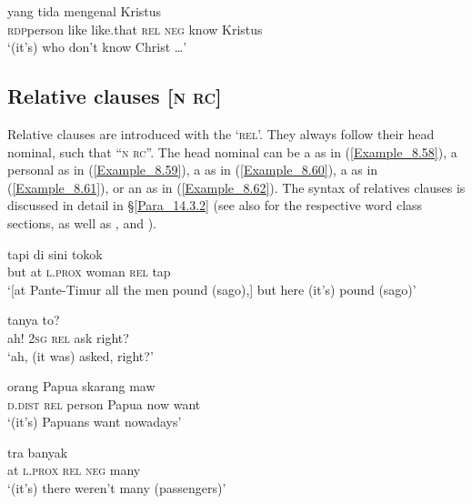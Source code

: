 \ea
\label{Example_8.57}
 {} {} {yang} {tida} {mengenal} {Kristus}\\ %
 \textsc{rdp}{\Tilde}person  like  like.that  \textsc{rel}  \textsc{neg}  know  Kristus\\
\glt
‘(it’s)  who don’t know Christ {\ldots}’ \textstyleExampleSource{[081006-023-CvEx.0034]}
\z


\subsection{Relative clauses [\textsc{n} \textsc{rc}]}
\label{Para_8.2.8}
Relative clauses are introduced with the   ‘\textsc{rel}’. They always follow their head nominal, such that ``\textsc{n} \textsc{rc}''. The head nominal can be a  as in (\ref{Example_8.58}), a personal  as in (\ref{Example_8.59}), a  as in (\ref{Example_8.60}), a  as in (\ref{Example_8.61}), or an  as in (\ref{Example_8.62}). The syntax of relatives clauses is discussed in detail in §\ref{Para_14.3.2} (see also  for the respective word class sections, as well as , and ).


\ea
\label{Example_8.58}
\gll {\ldots} {tapi} {di} {sini} {} {} {tokok}\\ %
  { }  but  at  \textsc{l.prox}  woman  \textsc{rel}  tap\\
\glt 
‘[at Pante-Timur all the men pound (sago),] but here (it’s)  pound (sago)’ \textstyleExampleSource{[081014-007-CvEx.0073]}
\z

\ea
\label{Example_8.59}
 {} {} {tanya} {to?}\\ %
 ah!  \textsc{2sg}  \textsc{rel}  ask  right?\\
\glt 
‘ah, (it was)  asked, right?’ \textstyleExampleSource{[080923-014-CvEx.0010]}
\z

\ea
\label{Example_8.60}
 {} {orang} {Papua} {skarang} {maw}\\ %
 \textsc{d.dist}  \textsc{rel}  person  Papua  now  want\\
\glt 
‘(it’s)  Papuans want nowadays’ \textstyleExampleSource{[081025-004-Cv.0077]}
\z

\ea
\label{Example_8.61}
 {} {} {tra} {banyak}\\ %
 at  \textsc{l.prox}  \textsc{rel}  \textsc{neg}  many\\
 ‘(it’s)  there weren’t many (passengers)’ \textstyleExampleSource{[081025-008-Cv.0140]}
\z

